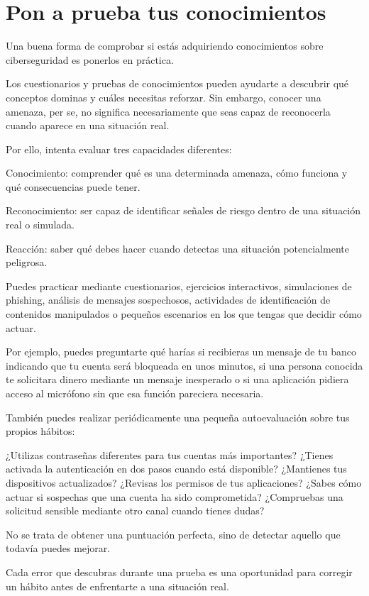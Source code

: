\documentclass[
  spanish,
  a4paper,
  openany]{book}
\begin{document}
\section{Pon a prueba tus conocimientos}\label{pon-a-prueba-tus-conocimientos}

Una buena forma de comprobar si estás adquiriendo conocimientos sobre ciberseguridad es ponerlos en práctica.

Los cuestionarios y pruebas de conocimientos pueden ayudarte a descubrir qué conceptos dominas y cuáles necesitas reforzar. Sin embargo, conocer una amenaza, per se, no significa necesariamente que seas capaz de reconocerla cuando aparece en una situación real.

Por ello, intenta evaluar tres capacidades diferentes:

Conocimiento: comprender qué es una determinada amenaza, cómo funciona y qué consecuencias puede tener.

Reconocimiento: ser capaz de identificar señales de riesgo dentro de una situación real o simulada.

Reacción: saber qué debes hacer cuando detectas una situación potencialmente peligrosa.

Puedes practicar mediante cuestionarios, ejercicios interactivos, simulaciones de phishing, análisis de mensajes sospechosos, actividades de identificación de contenidos manipulados o pequeños escenarios en los que tengas que decidir cómo actuar.

Por ejemplo, puedes preguntarte qué harías si recibieras un mensaje de tu banco indicando que tu cuenta será bloqueada en unos minutos, si una persona conocida te solicitara dinero mediante un mensaje inesperado o si una aplicación pidiera acceso al micrófono sin que esa función pareciera necesaria.

También puedes realizar periódicamente una pequeña autoevaluación sobre tus propios hábitos:

¿Utilizas contraseñas diferentes para tus cuentas más importantes? ¿Tienes activada la autenticación en dos pasos cuando está disponible? ¿Mantienes tus dispositivos actualizados? ¿Revisas los permisos de tus aplicaciones? ¿Sabes cómo actuar si sospechas que una cuenta ha sido comprometida? ¿Compruebas una solicitud sensible mediante otro canal cuando tienes dudas?

No se trata de obtener una puntuación perfecta, sino de detectar aquello que todavía puedes mejorar.

Cada error que descubras durante una prueba es una oportunidad para corregir un hábito antes de enfrentarte a una situación real.
\end{document}
